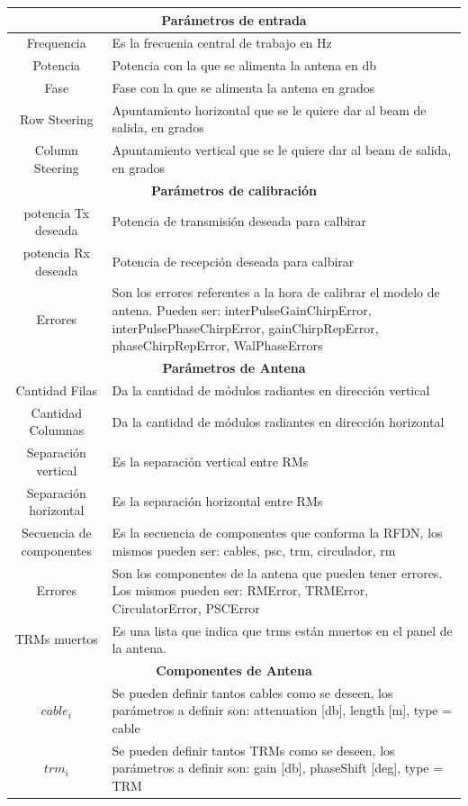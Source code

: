 \begin{center}
  \footnotesize
  \centering
  \begin{longtable}{|c|p{9cm}|}
    \hline 
	\multicolumn{2}{|c|}{\textbf{Parámetros de entrada}} \\ 
	\hline
    Frequencia		& Es la frecuenia central de trabajo en Hz \tabularnewline \hline 
    Potencia		& Potencia con la que se alimenta la antena en db \tabularnewline \hline 
    Fase			& Fase con la que se alimenta la antena en grados \tabularnewline \hline 
    Row Steering	& Apuntamiento horizontal que se le quiere dar al beam de salida, en grados  \tabularnewline \hline 
    Column Steering	& Apuntamiento vertical que se le quiere dar al beam de salida, en grados  \tabularnewline \hline 
	\multicolumn{2}{|c|}{\textbf{Parámetros de calibración}} \\ 
	\hline
	potencia Tx deseada	& Potencia de transmisión deseada para calbirar  \tabularnewline \hline 
	potencia Rx deseada	& Potencia de recepción deseada para calbirar  \tabularnewline \hline 
	Errores	& Son los errores referentes a la hora de calibrar el modelo de antena. Pueden ser: interPulseGainChirpError, interPulsePhaseChirpError, gainChirpRepError, phaseChirpRepError, WalPhaseErrors  \tabularnewline \hline
	\multicolumn{2}{|c|}{\textbf{Parámetros de Antena}} \\ 
	\hline
	Cantidad Filas	& Da la cantidad de módulos radiantes en dirección vertical \tabularnewline \hline 
	Cantidad Columnas	& Da la cantidad de módulos radiantes en dirección horizontal \tabularnewline \hline 
	Separación vertical & Es la separación vertical entre RMs \tabularnewline \hline 
	Separación horizontal & Es la separación horizontal entre RMs \tabularnewline \hline 
	Secuencia de componentes & Es la secuencia de componentes que conforma la RFDN, los mismos pueden ser: cables, psc, trm, circulador, rm \tabularnewline \hline 
	Errores  & Son los componentes de la antena que pueden tener errores. Los mismos pueden ser: RMError, TRMError, CirculatorError, PSCError \tabularnewline \hline 
	TRMs muertos & Es una lista que indica que trms están muertos en el panel de la antena. \tabularnewline \hline 
	\multicolumn{2}{|c|}{\textbf{Componentes de Antena}} \\
	\hline
	$cable_i$ & Se pueden definir tantos cables como se deseen, los parámetros a definir son: attenuation [db], length [m], type = cable \tabularnewline \hline 
	$trm_i$ & Se pueden definir tantos TRMs como se deseen, los parámetros a definir son: gain [db], phaseShift [deg], type = TRM \tabularnewline \hline 

\end{longtable}
\end{center}

